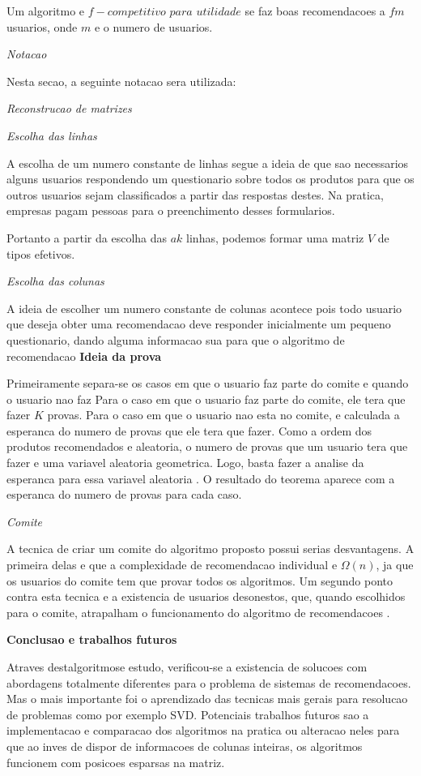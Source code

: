 \documentclass[a4paper,10pt]{article}
\begin{document}
Um algoritmo e $f-competitivo$ $para$ $utilidade$
se faz boas recomendacoes a $fm$ usuarios, onde $m$ e o numero de usuarios. 

\textit{Notacao}

Nesta secao, a seguinte notacao sera utilizada:

\textit{Reconstrucao de matrizes}

\textit{Escolha das linhas}

A escolha de um numero constante de linhas segue a ideia de que sao necessarios
alguns usuarios respondendo um questionario sobre todos os produtos para que os
outros usuarios sejam classificados a partir das respostas destes. Na pratica, empresas
pagam pessoas para o preenchimento desses formularios.

Portanto a partir da escolha das $ak$ linhas, podemos formar uma matriz $V$ de tipos efetivos.

\textit{Escolha das colunas}

A ideia de escolher um numero constante de colunas acontece pois todo usuario
que deseja obter uma recomendacao deve responder inicialmente um pequeno 
questionario, dando alguma informacao sua para que o algoritmo de recomendacao
\textbf{Ideia da prova}

Primeiramente separa-se os casos em que o usuario faz parte do comite e quando
o usuario nao faz 
Para o caso em que o usuario faz parte do comite, ele tera que fazer $K$ provas.
Para o caso em que o usuario nao esta no comite, e calculada a esperanca do numero 
de provas que ele tera que fazer. Como a ordem dos produtos
recomendados e aleatoria, o numero de provas que um usuario tera que fazer
e uma variavel aleatoria geometrica. Logo, basta fazer a analise da esperanca
para essa variavel aleatoria \cite{MG}.
O resultado do teorema aparece com a esperanca do numero de provas para
cada caso.

\textit{Comite}

A tecnica de criar um comite do algoritmo proposto possui serias
desvantagens. 
A primeira delas e que a complexidade de recomendacao individual
e $\Omega(n)$, ja que os usuarios do comite tem que provar todos os
algoritmos. 
Um segundo ponto contra esta tecnica e a existencia de usuarios desonestos,
que, quando escolhidos para o comite, atrapalham o funcionamento do 
algoritmo de recomendacoes \cite{Boney96}.

\textbf{Conclusao e trabalhos futuros}

Atraves destalgoritmose estudo, verificou-se a existencia de solucoes com abordagens
totalmente diferentes para o problema de sistemas de recomendacoes. Mas o mais
importante foi o aprendizado das tecnicas mais gerais para resolucao de problemas
como por exemplo SVD. 
Potenciais trabalhos futuros sao a implementacao e comparacao dos algoritmos na pratica
ou alteracao neles para que ao inves de dispor de informacoes de colunas inteiras, os
algoritmos funcionem com posicoes esparsas na matriz. 
\end{document}
